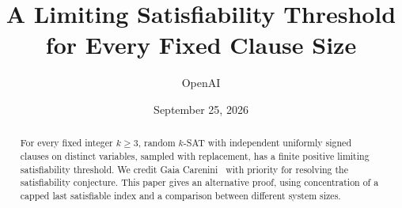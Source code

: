 \documentclass[11pt]{article}
\title{A Limiting Satisfiability Threshold\\for Every Fixed Clause Size}
\author{OpenAI}
\date{September 25, 2026}
\begin{document}
\maketitle
\begin{abstract}
For every fixed integer \(k\ge3\), random \(k\)-SAT with independent
uniformly signed clauses on distinct variables, sampled with replacement,
has a finite positive limiting satisfiability threshold.
We credit Gaia Carenini~\cite{Carenini2026Polynomial} with priority for
resolving the satisfiability conjecture. This paper gives an alternative
proof, using concentration of a capped last satisfiable index and a
comparison between different system sizes.
\end{abstract}










\end{document}
